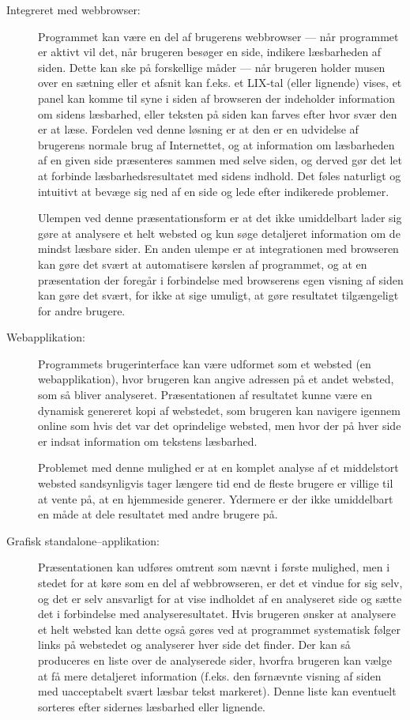 \documentclass[a4paper,oneside]{memoir}
\begin{document}
\begin{description}
\item[Integreret med webbrowser:]
  Programmet kan være en del af brugerens webbrowser --- når
  programmet er aktivt vil det, når brugeren besøger en side, indikere
  læsbarheden af siden. Dette kan ske på forskellige måder --- når
  brugeren holder musen over en sætning eller et afsnit kan f.eks. et
  LIX-tal (eller lignende) vises, et panel kan komme til syne i siden
  af browseren der indeholder information om sidens læsbarhed, eller
  teksten på siden kan farves efter hvor svær den er at læse. Fordelen
  ved denne løsning er at den er en udvidelse af brugerens normale
  brug af Internettet, og at information om læsbarheden af en given
  side præsenteres sammen med selve siden, og derved gør det let at
  forbinde læsbarhedsresultatet med sidens indhold. Det føles
  naturligt og intuitivt at bevæge sig ned af en side og lede efter
  indikerede problemer. 

  Ulempen ved denne præsentationsform er at det ikke umiddelbart lader
  sig gøre at analysere et helt websted og kun søge detaljeret
  information om de mindst læsbare sider. En anden ulempe er at
  integrationen med browseren kan gøre det svært at automatisere
  kørslen af programmet, og at en præsentation der foregår i
  forbindelse med browserens egen visning af siden kan gøre det svært,
  for ikke at sige umuligt, at gøre resultatet tilgængeligt for andre
  brugere.

\item[Webapplikation:]
  Programmets brugerinterface kan være udformet som et websted (en
  webapplikation), hvor brugeren kan angive adressen på et andet
  websted, som så bliver analyseret. Præsentationen af resultatet
  kunne være en dynamisk genereret kopi af webstedet, som brugeren kan
  navigere igennem online som hvis det var det oprindelige websted,
  men hvor der på hver side er indsat information om tekstens
  læsbarhed. 

  Problemet med denne mulighed er at en komplet analyse af et
  middelstort websted sandsynligvis tager længere tid end de fleste
  brugere er villige til at vente på, at en hjemmeside
  generer. Ydermere er der ikke umiddelbart en måde at dele resultatet
  med andre brugere på.

\item[Grafisk standalone--applikation:] 
  Præsentationen kan udføres omtrent som nævnt i første mulighed, men
  i stedet for at køre som en del af webbrowseren, er det et vindue
  for sig selv, og det er selv ansvarligt for at vise indholdet af en
  analyseret side og sætte det i forbindelse med
  analyseresultatet. Hvis brugeren ønsker at analysere et helt websted
  kan dette også gøres ved at programmet systematisk følger links på
  webstedet og analyserer hver side det finder. Der kan så produceres
  en liste over de analyserede sider, hvorfra brugeren kan vælge at få
  mere detaljeret information (f.eks. den førnævnte visning af siden
  med uacceptabelt svært læsbar tekst markeret). Denne liste kan
  eventuelt sorteres efter sidernes læsbarhed eller lignende.


\end{description}
\end{document}
